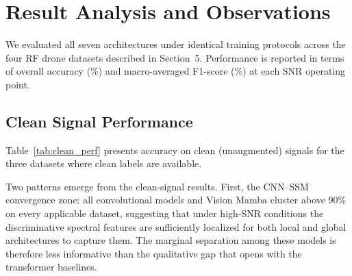 \documentclass[runningheads]{llncs}
\begin{document}
\section{Result Analysis and Observations}

We evaluated all seven architectures under identical training protocols across the four RF drone datasets described in Section~5. Performance is reported in terms of overall accuracy (\%) and macro-averaged F1-score (\%) at each SNR operating point.

\subsection{Clean Signal Performance}

Table~\ref{tab:clean_perf} presents accuracy on clean (unaugmented) signals for the three datasets where clean labels are available.

\begin{table}[htbp]
\centering
\caption{Classification Accuracy (\%) on Clean Signals Across Four Datasets}
\label{tab:clean_perf}
\renewcommand{\arraystretch}{1.15}
\end{table}

Two patterns emerge from the clean-signal results. First, the CNN--SSM convergence zone: all convolutional models and Vision Mamba cluster above 90\% on every applicable dataset, suggesting that under high-SNR conditions the discriminative spectral features are sufficiently localized for both local and global architectures to capture them. The marginal separation among these models is therefore less informative than the qualitative gap that opens with the transformer baselines.
\end{document}
